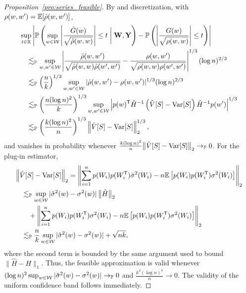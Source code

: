 \begin{proof}[Proposition~\ref{pro:series_feasible}]
  By \citet[Lemma~3.1]{chernozhukov2013gaussian} and discretization,
  with $\rho(w,w') = \mathbb{E}[\hat\rho(w,w')]$,
  \begin{align*}
    &\sup_{t \in \mathbb{R}}
    \left|
    \mathbb{P}\left(
      \sup_{w \in \mathcal{W}}
      \left|
      \frac{\hat G(w)}{\sqrt{\hat\rho(w,w)}}
      \right|
      \leq t \biggm| \mathbf{W}, \mathbf{Y}
    \right)
    - \mathbb{P}\left(
      \left|
      \frac{G(w)}{\sqrt{\rho(w,w)}}
      \right|
      \leq t
    \right)
    \right| \\
    &\quad\lesssim_{\mathbb{P}}
    \sup_{w,w' \in \mathcal{W}}
    \left|
    \frac{\hat\rho(w,w')}
    {\sqrt{\hat\rho(w,w)\hat\rho(w',w')}}
    - \frac{\rho(w,w')}
    {\sqrt{\rho(w,w)\rho(w',w')}}
    \right|^{1/3}
    (\log n)^{2/3} \\
    &\quad\lesssim_{\mathbb{P}}
    \left(\frac n k \right)^{1/3}
    \sup_{w,w' \in \mathcal{W}} |\hat\rho(w,w') - \rho(w,w')|^{1/3}
    (\log n)^{2/3} \\
    &\quad\lesssim_{\mathbb{P}}
    \left( \frac{n (\log n)^2}{k} \right)^{1/3}
    \sup_{w,w' \in \mathcal{W}}
    \left|
    p(w)^{\mathsf{T}} \hat H^{-1}
    \left(
      \hat{V}[S]
      - \operatorname{Var}[S]
    \right)
    \hat H^{-1} p(w')
    \right|^{1/3} \\
    &\quad\lesssim_{\mathbb{P}}
    \left( \frac{k (\log n)^2}{n} \right)^{1/3}
    \left\|
    \hat{V}[S]
    - \operatorname{Var}[S]
    \right\|_2^{1/3},
  \end{align*}
  and vanishes in probability whenever
  $\frac{k (\log n)^2}{n}
  \big\| \hat{V}[S] - \operatorname{Var}[S] \big\|_2 \to_{\mathbb{P}} 0$.
  For the plug-in estimator,
  \begin{align*}
    &\left\|
    \hat{V}[S]
    - \operatorname{Var}[S]
    \right\|_2
    =
    \left\|
    \sum_{i=1}^n
    p(W_i) p(W_i^{\mathsf{T}})
    \hat\sigma^2(W_i)
    - n \mathbb{E}\left[
      p(W_i) p(W_i^{\mathsf{T}})
      \sigma^2(W_i)
    \right]
    \right\|_2 \\
    &\quad\lesssim_{\mathbb{P}}
    \sup_{w \in \mathcal{W}}
    |\hat{\sigma}^2(w)-\sigma^2(w)|
    \, \big\| \hat H \big\|_2 \\
    &\qquad+
    \left\|
    \sum_{i=1}^n
    p(W_i) p(W_i^{\mathsf{T}})
    \sigma^2(W_i)
    - n \mathbb{E}\left[
      p(W_i) p(W_i^{\mathsf{T}})
      \sigma^2(W_i)
    \right]
    \right\|_2 \\
    &\quad\lesssim_{\mathbb{P}}
    \frac{n}{k}
    \sup_{w \in \mathcal{W}}
    |\hat{\sigma}^2(w)-\sigma^2(w)|
    + \sqrt{n k},
  \end{align*}
  where the second term is bounded by the same argument
  used to bound $\|\hat H - H\|_1$.
  Thus, the feasible approximation is valid whenever
  $(\log n)^2 \sup_{w \in \mathcal{W}}
  |\hat{\sigma}^2(w)-\sigma^2(w)| \to_{\mathbb{P}} 0$
  and $\frac{k^3 (\log n)^4}{n} \to 0$.
  The validity of the uniform confidence band follows immediately.
\end{proof}

